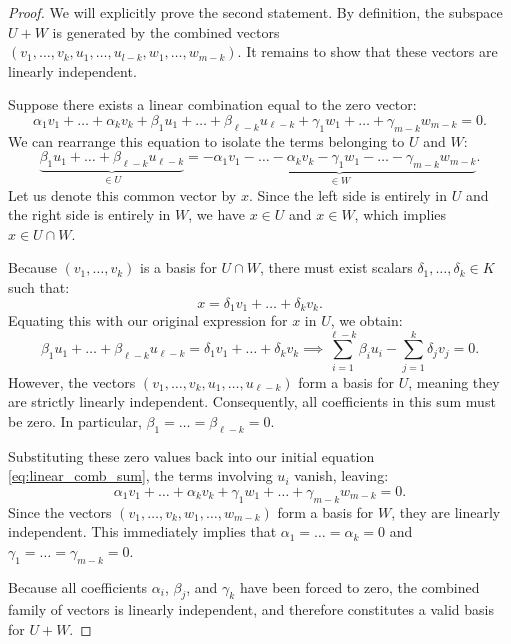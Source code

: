 \begin{proof}
We will explicitly prove the second statement. By definition, the subspace $U + W$ is generated by the combined vectors $(v_1, \dots, v_k, u_1, \dots, u_{l-k}, w_1, \dots, w_{m-k})$. It remains to show that these vectors are linearly independent.

Suppose there exists a linear combination equal to the zero vector:
\begin{equation}
\label{eq:linear_comb_sum}
\alpha_1 v_1 + \dots + \alpha_k v_k + \beta_1 u_1 + \dots + \beta_{\ell-k} u_{\ell-k} + \gamma_1 w_1 + \dots + \gamma_{m-k} w_{m-k} = 0.
\end{equation}
We can rearrange this equation to isolate the terms belonging to $U$ and $W$:
\[
\underbrace{\beta_1 u_1 + \dots + \beta_{\ell-k} u_{\ell-k}}_{\in U} = \underbrace{-\alpha_1 v_1 - \dots - \alpha_k v_k - \gamma_1 w_1 - \dots - \gamma_{m-k} w_{m-k}}_{\in W}.
\]
Let us denote this common vector by $x$. Since the left side is entirely in $U$ and the right side is entirely in $W$, we have $x \in U$ and $x \in W$, which implies $x \in U \cap W$. 

Because $(v_1, \dots, v_k)$ is a basis for $U \cap W$, there must exist scalars $\delta_1, \dots, \delta_k \in K$ such that:
\[
x = \delta_1 v_1 + \dots + \delta_k v_k.
\]
Equating this with our original expression for $x$ in $U$, we obtain:
\[
\beta_1 u_1 + \dots + \beta_{\ell-k} u_{\ell-k} = \delta_1 v_1 + \dots + \delta_k v_k \implies \sum_{i=1}^{\ell-k} \beta_i u_i - \sum_{j=1}^k \delta_j v_j = 0.
\]
However, the vectors $(v_1, \dots, v_k, u_1, \dots, u_{\ell-k})$ form a basis for $U$, meaning they are strictly linearly independent. Consequently, all coefficients in this sum must be zero. In particular, $\beta_1 = \dots = \beta_{\ell-k} = 0$.

Substituting these zero values back into our initial equation \eqref{eq:linear_comb_sum}, the terms involving $u_i$ vanish, leaving:
\[
\alpha_1 v_1 + \dots + \alpha_k v_k + \gamma_1 w_1 + \dots + \gamma_{m-k} w_{m-k} = 0.
\]
Since the vectors $(v_1, \dots, v_k, w_1, \dots, w_{m-k})$ form a basis for $W$, they are linearly independent. This immediately implies that $\alpha_1 = \dots = \alpha_k = 0$ and $\gamma_1 = \dots = \gamma_{m-k} = 0$. 

Because all coefficients $\alpha_i$, $\beta_j$, and $\gamma_k$ have been forced to zero, the combined family of vectors is linearly independent, and therefore constitutes a valid basis for $U + W$.
\end{proof}

